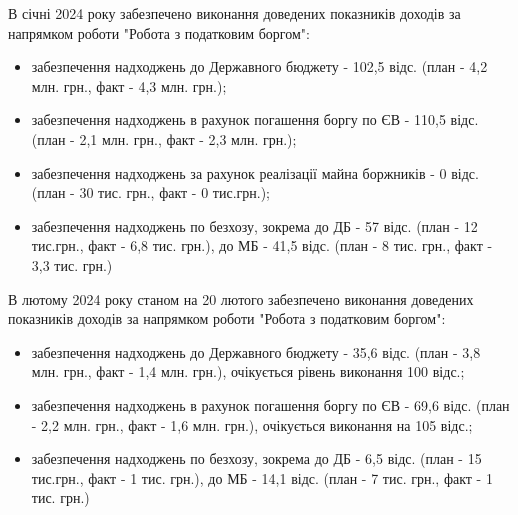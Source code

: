 \documentclass[a4paper,14pt]{article}
\begin{document}
В січні 2024 року забезпечено виконання доведених показників доходів за напрямком роботи  "Робота з податковим боргом":
\begin{itemize}
	\item забезпечення надходжень до Державного бюджету - 102,5 відс. (план - 4,2 млн. грн., факт - 4,3 млн. грн.);
	\item забезпечення надходжень в рахунок погашення боргу по ЄВ - 110,5 відс. (план - 2,1 млн. грн., факт - 2,3 млн. грн.);
	\item забезпечення надходжень за рахунок реалізації майна боржників - 0 відс. (план - 30 тис. грн., факт - 0 тис.грн.);
	\item забезпечення надходжень по безхозу, зокрема до ДБ - 57 відс. (план - 12 тис.грн., факт - 6,8 тис. грн.), до МБ - 41,5 відс. (план - 8 тис. грн., факт - 3,3 тис. грн.) 
\end{itemize} 

В лютому 2024 року станом на 20 лютого забезпечено виконання доведених показників доходів за напрямком роботи  "Робота з податковим боргом":
\begin{itemize}
	\item забезпечення надходжень до Державного бюджету - 35,6 відс. (план - 3,8 млн. грн., факт - 1,4 млн. грн.), очікується рівень виконання 100 відс.;
	\item забезпечення надходжень в рахунок погашення боргу по ЄВ - 69,6 відс. (план - 2,2 млн. грн., факт - 1,6 млн. грн.), очікується виконання на 105 відс.;
	\item забезпечення надходжень по безхозу, зокрема до ДБ - 6,5 відс. (план - 15 тис.грн., факт - 1 тис. грн.), до МБ - 14,1 відс. (план - 7 тис. грн., факт - 1 тис. грн.) 
\end{itemize} 
	
	
	
\end{document}

